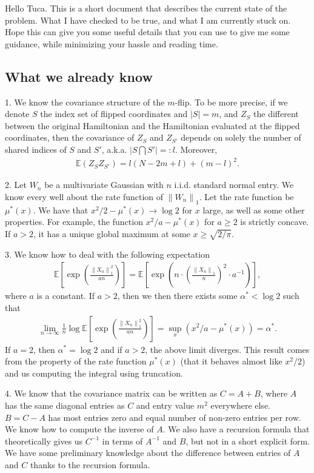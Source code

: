 \documentclass[10pt]{article}
\author{Yi Gu}
\newcommand{\e}{\mathbb{E}}
\newcommand{\norm}[1]{\left\lVert#1\right\rVert}
\newenvironment{Proof of lemma}{\noindent{\bf Proof of Lemma}}{\hfill$\Box$\newline}
\newenvironment{Proof of claim}{\noindent{\bf Proof of claim}}{\hfill$\Box$\newline}
\newenvironment{Proof of theorem}{\noindent{\bf Proof of Theorem}}{\hfill\scriptsize{$\Box$}\newline}
\newenvironment{Proof of theorems}{\noindent{\bf Proof of Theorems}}{\hfill$\Box$\newline}
\newenvironment{Proof of proposition}{\noindent{\bf Proof of Proposition}}{\hfill$\Box$\newline}
\newenvironment{Proof of propositions}{\noindent{\bf Proof of Propositions}}{\hfill$\Box$\newline}
\newenvironment{Proof of exercise}{\noindent{\it Proof of Exercise:}}{\hfill$\Box$}
\begin{document}
Hello Tuca. This is a short document that describes the current state of the problem. What I have checked to be true, and what I am currently stuck on. Hope this can give you some useful details that you can use to give me some guidance, while minimizing your hassle and reading time.

\subsection*{What we already know}
1. We know the covariance structure of the $m$-flip. To be more precise, if we denote $S$ the index set of flipped coordinates and $|S|= m$, and $Z_S$ the different between the original Hamiltonian and the Hamiltonian evaluated at the flipped coordinates, then the covariance of $Z_S$ and $Z_{S'}$ depends on solely the number of shared indices of $S$ and $S'$, a.k.a. $|S \bigcap S'| =: l$. Moreover,
\begin{align}
    \e(Z_S Z_{S'}) = l(N-2m+l)+(m-l)^2.
\end{align}

2. Let $W_n$ be a multivariate Gaussian with $n$ i.i.d. standard normal entry. We know every well about the rate function of $\norm{W_n}_1$. Let the rate function be $\mu^*(x)$. We have that $x^2/2 - \mu^*(x)\to \log 2$ for $x$ large, as well as some other properties. For example, the function $x^2/a - \mu^*(x)$ for $a \geq 2$ is strictly concave. If $a > 2$, it has a unique global maximum at some $x \geq \sqrt{2/\pi}$.

3.  We know how to deal with the following expectation
\begin{align} \label{target_expectation}
    \e \left[ \exp \left(\frac{\norm{X_n}_1^2}{an}\right)\right] = \e \left[ \exp \left(n \cdot \left(\frac{\norm{X_n}_1}{n}\right)^2 \cdot a^{-1}\right)\right],
\end{align}
where $a$ is a constant. If $a>2$, then we then there exists some $\alpha^* < \log 2$ such that
\begin{align}
    \lim_{n \to \infty} \frac{1}{n} \log \e \left[ \exp \left(\frac{\norm{X_n}_1^2}{an}\right)\right] = \sup_x (x^2/a - \mu^*(x)) = \alpha^*.
\end{align}
If $a=2$, then $\alpha^*= \log 2$ and if $a > 2$, the above limit diverges. This result comes from the property of the rate function $\mu^*(x)$ (that it behaves almost like $x^2/2$) and us computing the integral using truncation.

4. We know that the covariance matrix can be written as $C = A+B$, where $A$ has the same diagonal entries as $C$ and entry value $m^2$ everywhere else. $B = C - A$ has most entries zero and equal number of non-zero entries per row. We know how to compute the inverse of $A$. We also have a recursion formula that theoretically gives us $C^{-1}$ in terms of $A^{-1}$ and $B$, but not in a short explicit form. We have some preliminary knowledge about the difference between entries of $A$ and $C$ thanks to the recursion formula.
\end{document}
